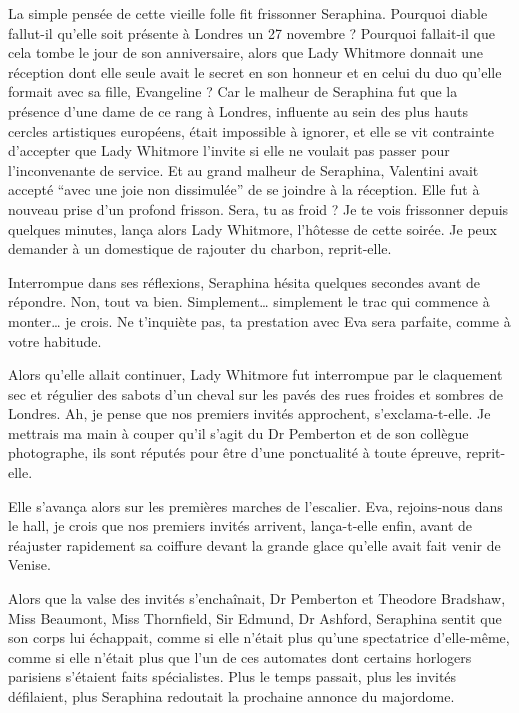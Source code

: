 La simple pensée de cette vieille folle fit frissonner Seraphina.
Pourquoi diable fallut-il qu'elle soit présente à Londres un 27 novembre ?
Pourquoi fallait-il que cela tombe le jour de son anniversaire, alors que Lady Whitmore donnait une réception dont elle seule avait le secret en son honneur et en celui du duo qu'elle formait avec sa fille, Evangeline ?
Car le malheur de Seraphina fut que la présence d'une dame de ce rang à Londres, influente au sein des plus hauts cercles artistiques européens, était impossible à ignorer, et elle se vit contrainte d'accepter que Lady Whitmore l'invite si elle ne voulait pas passer pour l'inconvenante de service.
Et au grand malheur de Seraphina, Valentini avait accepté \enquote{avec une joie non dissimulée} de se joindre à la réception.
Elle fut à nouveau prise d'un profond frisson.
\rep Sera, tu as froid ?
Je te vois frissonner depuis quelques minutes, lança alors Lady Whitmore, l’hôtesse de cette soirée.
Je peux demander à un domestique de rajouter du charbon, reprit-elle.

Interrompue dans ses réflexions, Seraphina hésita quelques secondes avant de répondre.
\rep Non, tout va bien.
Simplement\ldots{} simplement le trac qui commence à monter\ldots{} je crois.
\rep Ne t'inquiète pas, ta prestation avec Eva sera parfaite, comme à votre habitude.

Alors qu'elle allait continuer, Lady Whitmore fut interrompue par le claquement sec et régulier des sabots d'un cheval sur les pavés des rues froides et sombres de Londres.
\rep Ah, je pense que nos premiers invités approchent, s'exclama-t-elle.
Je mettrais ma main à couper qu'il s'agit du Dr Pemberton et de son collègue photographe, ils sont réputés pour être d'une ponctualité à toute épreuve, reprit-elle.

Elle s'avança alors sur les premières marches de l'escalier.
\rep Eva, rejoins-nous dans le hall, je crois que nos premiers invités arrivent, lança-t-elle enfin, avant de réajuster rapidement sa coiffure devant la grande glace qu'elle avait fait venir de Venise.

\separation

Alors que la valse des invités s’enchaînait, Dr Pemberton et Theodore Bradshaw, Miss Beaumont, Miss Thornfield, Sir Edmund, Dr Ashford, Seraphina sentit que son corps lui échappait, comme si elle n’était plus qu'une spectatrice d'elle-même, comme si elle n’était plus que l'un de ces automates dont certains horlogers parisiens s’étaient faits spécialistes.
Plus le temps passait, plus les invités défilaient, plus Seraphina redoutait la prochaine annonce du majordome.

